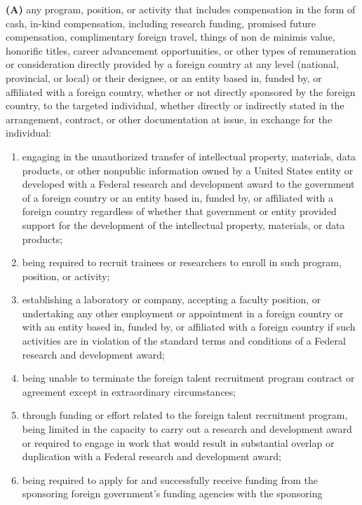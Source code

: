 \documentclass[
]{article}
\providecommand{\tightlist}{%
  \setlength{\itemsep}{0pt}\setlength{\parskip}{0pt}}
\begin{document}
\textbf{(A)} any program, position, or activity that includes
compensation in the form of cash, in-kind compensation, including
research funding, promised future compensation, complimentary foreign
travel, things of non de minimis value, honorific titles, career
advancement opportunities, or other types of remuneration or
consideration directly provided by a foreign country at any level
(national, provincial, or local) or their designee, or an entity based
in, funded by, or affiliated with a foreign country, whether or not
directly sponsored by the foreign country, to the targeted individual,
whether directly or indirectly stated in the arrangement, contract, or
other documentation at issue, in exchange for the individual:

\begin{enumerate}
\def\labelenumi{\arabic{enumi}.}
\tightlist
\item
  engaging in the unauthorized transfer of intellectual property,
  materials, data products, or other nonpublic information owned by a
  United States entity or developed with a Federal research and
  development award to the government of a foreign country or an entity
  based in, funded by, or affiliated with a foreign country regardless
  of whether that government or entity provided support for the
  development of the intellectual property, materials, or data products;
\item
  being required to recruit trainees or researchers to enroll in such
  program, position, or activity;
\item
  establishing a laboratory or company, accepting a faculty position, or
  undertaking any other employment or appointment in a foreign country
  or with an entity based in, funded by, or affiliated with a foreign
  country if such activities are in violation of the standard terms and
  conditions of a Federal research and development award;
\item
  being unable to terminate the foreign talent recruitment program
  contract or agreement except in extraordinary circumstances;
\item
  through funding or effort related to the foreign talent recruitment
  program, being limited in the capacity to carry out a research and
  development award or required to engage in work that would result in
  substantial overlap or duplication with a Federal research and
  development award;
\item
  being required to apply for and successfully receive funding from the
  sponsoring foreign government's funding agencies with the sponsoring

\end{enumerate}
\end{document}
